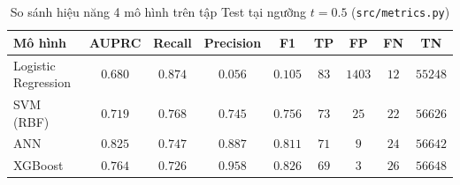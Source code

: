\begin{table}[H]
\centering
\caption{So sánh hiệu năng 4 mô hình trên tập Test tại ngưỡng $t = 0.5$ (\texttt{src/metrics.py})}
\label{tab:compare_4_models_t05}
\renewcommand{\arraystretch}{1.2}
\begin{tabular}{|l|c|c|c|c|c|c|c|c|}
\hline
\textbf{Mô hình} & \textbf{AUPRC} & \textbf{Recall} & \textbf{Precision} & \textbf{F1} & \textbf{TP} & \textbf{FP} & \textbf{FN} & \textbf{TN} \\
\hline
Logistic Regression & $0.680$ & $\mathbf{0.874}$ & $0.056$ & $0.105$ & $83$ & $1403$ & $12$ & $55248$ \\
\hline
SVM (RBF) & $0.719$ & $0.768$ & $0.745$ & $0.756$ & $73$ & $25$ & $22$ & $56626$ \\
\hline
ANN & $0.825$ & $0.747$ & $0.887$ & $0.811$ & $71$ & $9$ & $24$ & $56642$ \\
\hline
XGBoost & $0.764$ & $0.726$ & $0.958$ & $0.826$ & $69$ & $3$ & $26$ & $56648$ \\
\hline
\end{tabular}
\end{table}

